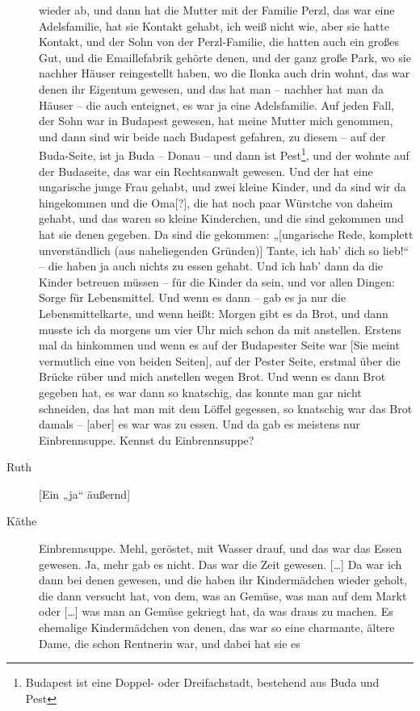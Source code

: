 \documentclass[ngerman,]{article}
\begin{document}
\begin{multicols}{2}
\begin{description}
wieder ab, und dann hat die Mutter mit der Familie Perzl, das war eine
Adelsfamilie, hat sie Kontakt gehabt, ich weiß nicht wie, aber sie hatte
Kontakt, und der Sohn von der Perzl-Familie, die hatten auch ein großes
Gut, und die Emaillefabrik gehörte denen, und der ganz große Park, wo
sie nachher Häuser reingestellt haben, wo die Ilonka auch drin wohnt,
das war denen ihr Eigentum gewesen, und das hat man – nachher hat man da
Häuser – die auch enteignet, es war ja eine Adelsfamilie. Auf jeden
Fall, der Sohn war in Budapest gewesen, hat meine Mutter mich genommen,
und dann sind wir beide nach Budapest gefahren, zu diesem – auf der
Buda-Seite, ist ja Buda – Donau – und dann ist Pest\footnote{Budapest
  ist eine Doppel- oder Dreifachstadt, bestehend aus Buda und Pest}, und
der wohnte auf der Budaseite, das war ein Rechtsanwalt gewesen. Und der
hat eine ungarische junge Frau gehabt, und zwei kleine Kinder, und da
sind wir da hingekommen und die Oma{[}?{]}, die hat noch paar Würstche
von daheim gehabt, und das waren so kleine Kinderchen, und die sind
gekommen und hat sie denen gegeben. Da sind die gekommen: „{[}ungarische
Rede, komplett unverständlich (aus naheliegenden Gründen){]} Tante, ich
hab' dich so lieb!“ – die haben ja auch nichts zu essen gehabt. Und ich
hab' dann da die Kinder betreuen müssen – für die Kinder da sein, und
vor allen Dingen: Sorge für Lebensmittel. Und wenn es dann – gab es ja
nur die Lebensmittelkarte, und wenn heißt: Morgen gibt es da Brot, und
dann musste ich da morgens um vier Uhr mich schon da mit anstellen.
Erstens mal da hinkommen und wenn es auf der Budapester Seite war {[}Sie
meint vermutlich eine von beiden Seiten{]}, auf der Pester Seite,
erstmal über die Brücke rüber und mich anstellen wegen Brot. Und wenn es
dann Brot gegeben hat, es war dann so knatschig, das konnte man gar
nicht schneiden, das hat man mit dem Löffel gegessen, so knatschig war
das Brot damals – {[}aber{]} es war was zu essen. Und da gab es meistens
nur Einbrennsuppe. Kennst du Einbrennsuppe?
\item[Ruth]
{[}Ein „ja“ äußernd{]}
\item[Käthe]
Einbrennsuppe. Mehl, geröstet, mit Wasser drauf, und das war das Essen
gewesen. Ja, mehr gab es nicht. Das war die Zeit gewesen. {[}\ldots{}{]}
Da war ich dann bei denen gewesen, und die haben ihr Kindermädchen
wieder geholt, die dann versucht hat, von dem, was an Gemüse, was man
auf dem Markt oder {[}\ldots{}{]} was man an Gemüse gekriegt hat, da was
draus zu machen. Es ehemalige Kindermädchen von denen, das war so eine
charmante, ältere Dame, die schon Rentnerin war, und dabei hat sie es

\end{description}
\end{multicols}
\end{document}
